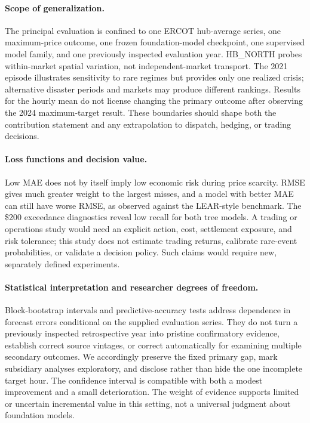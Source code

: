 \documentclass[11pt,letterpaper]{article}
\begin{document}
\paragraph{Scope of generalization.} The principal evaluation is confined to one ERCOT hub-average series, one maximum-price outcome, one frozen foundation-model checkpoint, one supervised model family, and one previously inspected evaluation year. HB\_NORTH probes within-market spatial variation, not independent-market transport. The 2021 episode illustrates sensitivity to rare regimes but provides only one realized crisis; alternative disaster periods and markets may produce different rankings. Results for the hourly mean do not license changing the primary outcome after observing the 2024 maximum-target result. These boundaries should shape both the contribution statement and any extrapolation to dispatch, hedging, or trading decisions.

\paragraph{Loss functions and decision value.} Low MAE does not by itself imply low economic risk during price scarcity. RMSE gives much greater weight to the largest misses, and a model with better MAE can still have worse RMSE, as observed against the LEAR-style benchmark. The \$200 exceedance diagnostics reveal low recall for both tree models. A trading or operations study would need an explicit action, cost, settlement exposure, and risk tolerance; this study does not estimate trading returns, calibrate rare-event probabilities, or validate a decision policy. Such claims would require new, separately defined experiments.

\paragraph{Statistical interpretation and researcher degrees of freedom.} Block-bootstrap intervals and predictive-accuracy tests address dependence in forecast errors conditional on the supplied evaluation series. They do not turn a previously inspected retrospective year into pristine confirmatory evidence, establish correct source vintages, or correct automatically for examining multiple secondary outcomes. We accordingly preserve the fixed primary gap, mark subsidiary analyses exploratory, and disclose rather than hide the one incomplete target hour. The confidence interval is compatible with both a modest improvement and a small deterioration. The weight of evidence supports limited or uncertain incremental value in this setting, not a universal judgment about foundation models.
\end{document}
